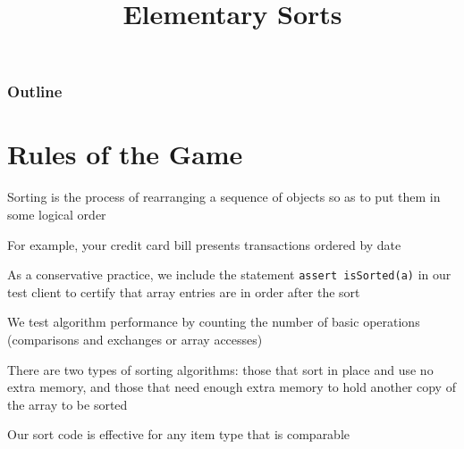 \documentclass[8pt,a4paper,compress]{beamer}
\title{Elementary Sorts}
\date{}
\begin{document}
\begin{frame}
\vfill
\titlepage
\end{frame}

\begin{frame}
\frametitle{Outline}
\tableofcontents
\end{frame}

\section{Rules of the Game}
\begin{frame}[fragile]
\pause

Sorting is the process of rearranging a sequence of objects so as to put them in some logical order

\pause
\bigskip

For example, your credit card bill presents transactions ordered by date

\pause
\bigskip

As a conservative practice, we include the statement \lstinline{assert isSorted(a)} in our test client to certify that array entries are in order after the sort

\pause
\bigskip

We test algorithm performance by counting the number of basic
operations (comparisons and exchanges or array accesses)

\pause
\bigskip

There are two types of sorting algorithms: those that sort in place and use no extra memory, and those that need enough extra memory to hold another copy of the array to be sorted

\pause
\bigskip

Our sort code is effective for any item type that is comparable
\end{frame}
\end{document}
